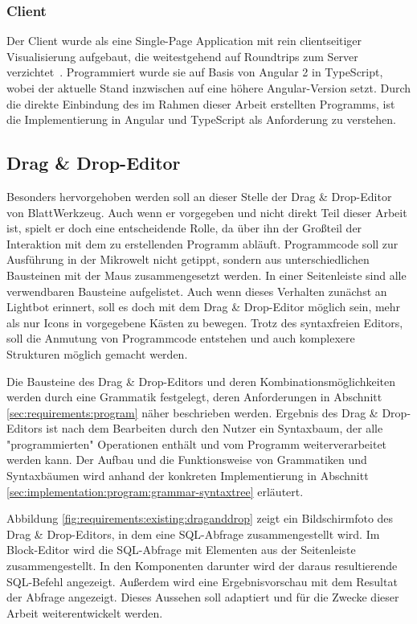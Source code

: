 \subsubsection{Client}

Der Client wurde als eine Single-Page Application mit rein clientseitiger Visualisierung aufgebaut, die weitestgehend auf Roundtrips zum Server verzichtet~\cite[94-95]{riemer2016}. Programmiert wurde sie auf Basis von Angular 2 in TypeScript, wobei der aktuelle Stand inzwischen auf eine höhere Angular-Version setzt. Durch die direkte Einbindung des im Rahmen dieser Arbeit erstellten Programms, ist die Implementierung in Angular und TypeScript als Anforderung zu verstehen.

\subsection{Drag \& Drop-Editor}
\label{sec:requirements:existing:structure:drag-drop}

Besonders hervorgehoben werden soll an dieser Stelle der Drag \& Drop-Editor von BlattWerkzeug. Auch wenn er vorgegeben und nicht direkt Teil dieser Arbeit ist, spielt er doch eine entscheidende Rolle, da über ihn der Großteil der Interaktion mit dem zu erstellenden Programm abläuft. Programmcode soll zur Ausführung in der Mikrowelt nicht getippt, sondern aus unterschiedlichen Bausteinen mit der Maus zusammengesetzt werden. In einer Seitenleiste sind alle verwendbaren Bausteine aufgelistet. Auch wenn dieses Verhalten zunächst an Lightbot erinnert, soll es doch mit dem Drag \& Drop-Editor möglich sein, mehr als nur Icons in vorgegebene Kästen zu bewegen. Trotz des syntaxfreien Editors, soll die Anmutung von Programmcode entstehen und auch komplexere Strukturen möglich gemacht werden.

Die Bausteine des Drag \& Drop-Editors und deren Kombinationsmöglichkeiten werden durch eine Grammatik festgelegt, deren Anforderungen in Abschnitt \ref{sec:requirements:program} näher beschrieben werden. Ergebnis des Drag \& Drop-Editors ist nach dem Bearbeiten durch den Nutzer ein Syntaxbaum, der alle "programmierten" Operationen enthält und vom Programm weiterverarbeitet werden kann. Der Aufbau und die Funktionsweise von Grammatiken und Syntaxbäumen wird anhand der konkreten Implementierung in Abschnitt \ref{sec:implementation:program:grammar-syntaxtree} erläutert.

Abbildung \ref{fig:requirements:existing:draganddrop} zeigt ein Bildschirmfoto des Drag \& Drop-Editors, in dem eine SQL-Abfrage zusammengestellt wird. Im Block-Editor wird die SQL-Abfrage mit Elementen aus der Seitenleiste zusammengestellt. In den Komponenten darunter wird der daraus resultierende SQL-Befehl angezeigt. Außerdem wird eine Ergebnisvorschau mit dem Resultat der Abfrage angezeigt. Dieses Aussehen soll adaptiert und für die Zwecke dieser Arbeit weiterentwickelt werden.


